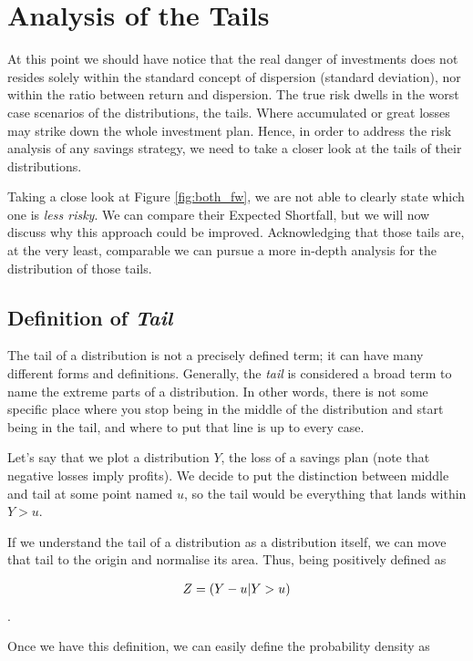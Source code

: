 \section{Analysis of the Tails}

At this point we should have notice that the real danger of investments does not resides solely within the standard concept of dispersion (standard deviation), nor within the ratio between return and dispersion. The true risk dwells in the worst case scenarios of the distributions, the tails. Where accumulated or great losses may strike down the whole investment plan. Hence, in order to address the risk analysis of any savings strategy, we need to take a closer look at the tails of their distributions. 

Taking a close look at Figure \ref{fig:both_fw}, we are not able to clearly state which one is \textit{less risky}. We can compare their Expected Shortfall, but we will now discuss why this approach could be improved. Acknowledging that those tails are, at the very least, comparable we can pursue a more in-depth analysis for the distribution of those tails.

\subsection{Definition of \textit{Tail}}

The tail of a distribution is not a precisely defined term; it can have many different forms and definitions. Generally, the \textit{tail} is considered a broad term to name the extreme parts of a distribution. In other words, there is not some specific place where you stop being in the middle of the distribution and start being in the tail, and where to put that line is up to every case.

Let's say that we plot a distribution $Y$, the loss of a savings plan (note that negative losses imply profits). We decide to put the distinction between middle and tail at some point named $u$, so the tail would be everything that lands within $Y>u$.

If we understand the tail of a distribution as a distribution itself, we can move that tail to the origin and normalise its area. Thus, being positively defined as

\begin{align}
    Z = \qty(Y-u | Y>u)
\end{align}.

Once we have this definition, we can easily define the probability density as


